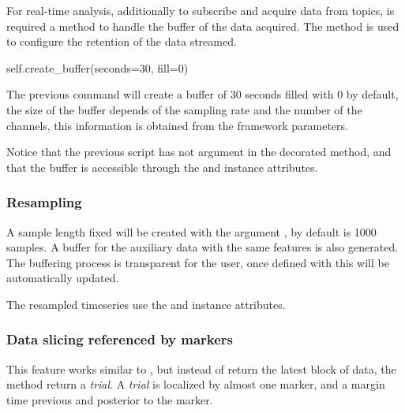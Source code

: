 For real-time analysis, additionally to subscribe and acquire data from topics, is required a method to handle the buffer of the data acquired. The  method is used to configure the retention of the data streamed.

\begin{python}
self.create_buffer(seconds=30, fill=0)
\end{python}

The previous command will create a buffer of 30 seconds filled with 0 by default, the size of the buffer depends of the sampling rate and the number of the channels, this information is obtained from the framework parameters. 



Notice that the previous script has not argument in the decorated method, and that the buffer is accessible through the  and  instance attributes.


\subsubsection{Resampling}

A sample length fixed will be created with the argument , by default is 1000 samples. A buffer for the auxiliary data with the same features is also generated. The buffering process is transparent for the user, once defined with  this will be automatically updated.



The resampled timeseries use the  and  instance attributes.


\subsubsection{Data slicing referenced by markers}

This feature works similar to , but instead of return the latest block of data, the  method return a \textit{trial}. A \textit{trial} is localized by almost one marker, and a margin time previous and posterior to the marker. 

